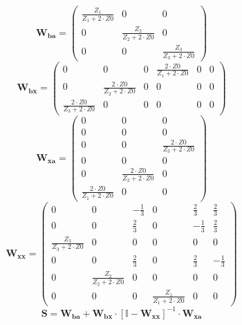 \[ \mathbf{W_{ba}} = \left(\begin{array}{ccc} \frac{Z_1}{Z_1+2\cdot
Z0} & 0 & 0 \\ 0 & \frac{Z_2}{Z_2+2\cdot Z0} & 0 \\ 0 & 0 &
\frac{Z_3}{Z_3+2\cdot Z0} \end{array}\right) \]
\[ \mathbf{W_{bx}} = \left(\begin{array}{cccccc} 0 & 0 & 0 &
\frac{2\cdot Z0}{Z_1+2\cdot Z0} & 0 & 0 \\ 0 & \frac{2\cdot
Z0}{Z_2+2\cdot Z0} & 0 & 0 & 0 & 0 \\ \frac{2\cdot Z0}{Z_3+2\cdot Z0}
& 0 & 0 & 0 & 0 & 0 \end{array}\right) \]
\[ \mathbf{W_{xa}} = \left(\begin{array}{ccc} 0 & 0 & 0 \\ 0 & 0 & 0
\\ 0 & 0 & \frac{2\cdot Z0}{Z_3+2\cdot Z0} \\ 0 & 0 & 0 \\ 0 &
\frac{2\cdot Z0}{Z_2+2\cdot Z0} & 0 \\ \frac{2\cdot Z0}{Z_1+2\cdot Z0}
& 0 & 0 \end{array}\right) \]
\[ \mathbf{W_{xx}} = \left(\begin{array}{cccccc} 0 & 0 & -\frac{1}{3}
& 0 & \frac{2}{3} & \frac{2}{3} \\ 0 & 0 & \frac{2}{3} & 0 &
-\frac{1}{3} & \frac{2}{3} \\ \frac{Z_3}{Z_3+2\cdot Z0} & 0 & 0 & 0 &
0 & 0 \\ 0 & 0 & \frac{2}{3} & 0 & \frac{2}{3} & -\frac{1}{3} \\ 0 &
\frac{Z_2}{Z_2+2\cdot Z0} & 0 & 0 & 0 & 0 \\ 0 & 0 & 0 &
\frac{Z_1}{Z_1+2\cdot Z0} & 0 & 0 \end{array}\right) \]
\[ \mathbf{S}=\mathbf{W_{ba}}+\mathbf{W_{bx}}\cdot\left[ \mathbb{I}
-\mathbf{W_{xx}}\right]^{-1}\cdot\mathbf{W_{xa}} \]
